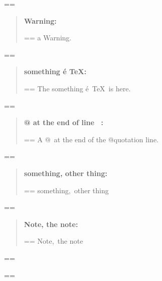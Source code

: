 \documentclass{book}
\makeatletter
\newenvironment{Texinfopreformatted}{%
  \par\GNUTobeylines\obeyspaces\frenchspacing\parskip=\z@\parindent=\z@}{}
{\catcode`\^^M=13 \gdef\GNUTobeylines{\catcode`\^^M=13 \def^^M{\null\par}}}
\newenvironment{Texinfoindented}{\begin{list}{}{}\item\relax}{\end{list}}
\renewcommand{\_}{\Texinfounderscore\discretionary{}{}{}}
\makeatother
\begin{document}
{{\begin{Texinfoindented}
\begin{Texinfopreformatted}
\ttfamily 
\end{Texinfopreformatted}
\begin{quote}
\textbf{Warning:} \begin{Texinfopreformatted}%
\ttfamily a Warning.
\end{Texinfopreformatted}
\end{quote}
\begin{Texinfopreformatted}%
\ttfamily 
\end{Texinfopreformatted}
\begin{quote}
\textbf{something \'{e} \TeX{}:} \begin{Texinfopreformatted}%
\ttfamily The something \'{e}\ \TeX{}\ is here.
\end{Texinfopreformatted}
\end{quote}
\begin{Texinfopreformatted}%
\ttfamily 
\end{Texinfopreformatted}
\begin{quote}
\textbf{@ at the end of line \ {}:} \begin{Texinfopreformatted}%
\ttfamily A @\ at the end of the @quotation line.
\end{Texinfopreformatted}
\end{quote}
\begin{Texinfopreformatted}%
\ttfamily 
\end{Texinfopreformatted}
\begin{quote}
\textbf{something, other thing:} \begin{Texinfopreformatted}%
\ttfamily something,\ other thing
\end{Texinfopreformatted}
\end{quote}
\begin{Texinfopreformatted}%
\ttfamily 
\end{Texinfopreformatted}
\begin{quote}
\textbf{Note, the note:} \begin{Texinfopreformatted}%
\ttfamily Note,\ the note
\end{Texinfopreformatted}
\end{quote}
\begin{Texinfopreformatted}%
\ttfamily 
\end{Texinfopreformatted}
\begin{quote}
\end{quote}
\begin{Texinfopreformatted}%
\ttfamily 
\end{Texinfopreformatted}
\begin{quote}

\end{quote}
\end{Texinfoindented}}}
\end{document}
